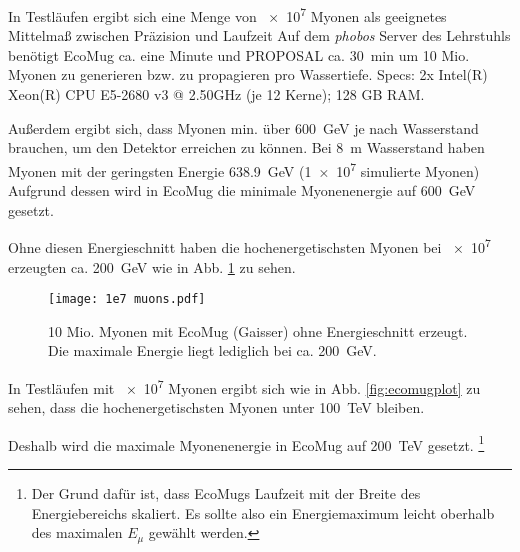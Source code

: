 


 In Testläufen ergibt sich eine Menge von 
\num{e7} Myonen als geeignetes Mittelmaß zwischen Präzision und 
Laufzeit
Auf dem \textit{phobos} Server des Lehrstuhls benötigt 
EcoMug ca. eine Minute und PROPOSAL ca. \SI[]{30}[]{min} um 10 Mio. Myonen zu generieren bzw. zu propagieren
pro Wassertiefe. Specs: 2x Intel(R) Xeon(R) CPU E5-2680 v3 @ 2.50GHz (je 12 Kerne); 128 GB RAM.

Außerdem ergibt sich, dass Myonen min. über \SI[]{600}[]{GeV} je nach Wasserstand 
brauchen, um den Detektor erreichen zu können.
Bei \SI[]{8}[]{m} Wasserstand haben Myonen mit der geringsten Energie \SI[]{638.9}[]{GeV} (\num[]{1e7} 
simulierte Myonen)
Aufgrund dessen wird in EcoMug die minimale Myonenenergie auf \SI[]{600}[]{GeV} gesetzt.

Ohne diesen Energieschnitt haben die hochenergetischsten Myonen bei \num{e7} erzeugten
ca. \SI[]{200}[]{GeV} wie in Abb. \ref{fig:minenergieplot} zu sehen.


\begin{figure}[h]
    \centering
    \texttt{[image: 1e7 muons.pdf]}
    \caption{10 Mio. Myonen mit EcoMug (Gaisser) ohne Energieschnitt erzeugt.
    Die maximale Energie liegt lediglich bei ca. \SI[]{200}[]{GeV}. }
    \label{fig:minenergieplot}
\end{figure}

In Testläufen mit \num{e7} Myonen ergibt sich wie in Abb. \ref{fig:ecomugplot} zu sehen,
dass die hochenergetischsten Myonen unter \SI[]{100}[]{TeV} bleiben.

Deshalb wird die maximale Myonenenergie in EcoMug auf \SI[]{200}[]{TeV} gesetzt. 
\footnote{Der Grund dafür ist, dass EcoMugs Laufzeit mit der Breite des Energiebereichs skaliert. 
Es sollte also ein Energiemaximum leicht oberhalb des maximalen $E_\mu$ gewählt werden.}  

